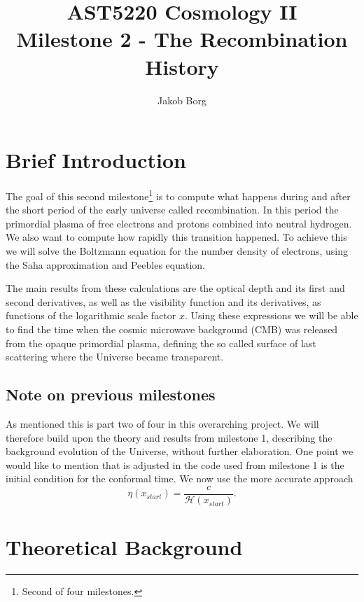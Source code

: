 \documentclass[10pt,a4paper]{article}
\title{AST5220 Cosmology \rm{II}\\ 
\vspace{5mm}Milestone 2 - The Recombination History}
\author{Jakob Borg}
\begin{document}
\maketitle
{}
 
\section{Brief Introduction}
The goal of this second milestone\footnote{Second of four milestones.} is to compute what happens during and after the short period of the early universe called recombination. In this period the primordial plasma of free electrons and protons combined into neutral hydrogen. We also want to compute how rapidly this transition happened. To achieve this we will solve the Boltzmann equation for the number density of electrons, using the Saha approximation and Peebles equation.

The main results from these calculations are the optical depth and its first and second derivatives, as well as the visibility function and its derivatives, as functions of the logarithmic scale factor $x$. Using these expressions we will be able to find the time when the cosmic microwave background (CMB) was released from the opaque primordial plasma, defining the so called surface of last scattering where the Universe became transparent.


\subsection{Note on previous milestones}
As mentioned this is part two of four in this overarching project. We will therefore build upon the theory and results from milestone 1\citep{milestone1}, describing the background evolution of the Universe, without further elaboration. One point we would like to mention that is adjusted in the code used from milestone 1 is the initial condition for the conformal time. We now use the more accurate approach
\begin{equation*}
    \eta(x_{start}) = \frac{c}{\mathcal{H}(x_{start})}.
\end{equation*}

\section{Theoretical Background}
\label{sec:Theory}
\end{document}
